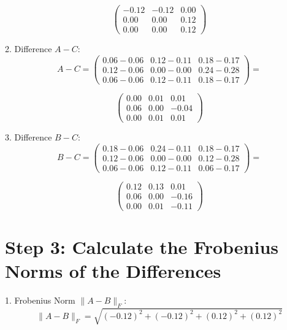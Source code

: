 \begin{equation}
\begin{pmatrix}
-0.12 & -0.12 & 0.00 \\
0.00 & 0.00 & 0.12 \\
0.00 & 0.00 & 0.12
\end{pmatrix}
\end{equation}

2. Difference \( A - C \):
\begin{equation} \nonumber
A - C = \begin{pmatrix}
0.06 - 0.06 & 0.12 - 0.11 & 0.18 - 0.17 \\
0.12 - 0.06 & 0.00 - 0.00 & 0.24 - 0.28 \\
0.06 - 0.06 & 0.12 - 0.11 & 0.18 - 0.17
\end{pmatrix} = 
\end{equation}

\begin{equation}
\begin{pmatrix}
0.00 & 0.01 & 0.01 \\
0.06 & 0.00 & -0.04 \\
0.00 & 0.01 & 0.01
\end{pmatrix}
\end{equation}


3. Difference \( B - C \):
\begin{equation} \nonumber
B - C = \begin{pmatrix}
0.18 - 0.06 & 0.24 - 0.11 & 0.18 - 0.17 \\
0.12 - 0.06 & 0.00 - 0.00 & 0.12 - 0.28 \\
0.06 - 0.06 & 0.12 - 0.11 & 0.06 - 0.17
\end{pmatrix} = 
\end{equation}

\begin{equation}
\begin{pmatrix}
0.12 & 0.13 & 0.01 \\
0.06 & 0.00 & -0.16 \\
0.00 & 0.01 & -0.11
\end{pmatrix}
\end{equation}


\section*{Step 3: Calculate the Frobenius Norms of the Differences}

1. Frobenius Norm \( \| A - B \|_F \):
\[
\| A - B \|_F = \sqrt{(-0.12)^2 + (-0.12)^2 + (0.12)^2 + (0.12)^2}
\]

